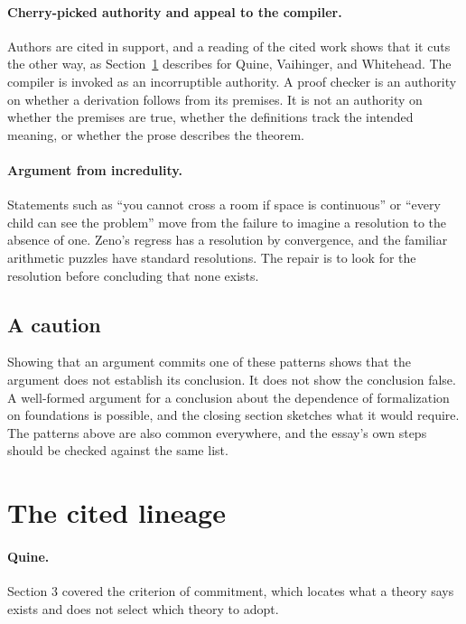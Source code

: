 \documentclass[11pt]{article}
\begin{document}
\paragraph{Cherry-picked authority and appeal to the compiler.} Authors are cited in support, and a reading of the cited work shows that it cuts the other way, as Section~\ref{sec:lineage} describes for Quine, Vaihinger, and Whitehead. The compiler is invoked as an incorruptible authority. A proof checker is an authority on whether a derivation follows from its premises. It is not an authority on whether the premises are true, whether the definitions track the intended meaning, or whether the prose describes the theorem.

\paragraph{Argument from incredulity.} Statements such as ``you cannot cross a room if space is continuous'' or ``every child can see the problem'' move from the failure to imagine a resolution to the absence of one. Zeno's regress has a resolution by convergence, and the familiar arithmetic puzzles have standard resolutions. The repair is to look for the resolution before concluding that none exists.

\subsection{A caution}

Showing that an argument commits one of these patterns shows that the argument does not establish its conclusion. It does not show the conclusion false. A well-formed argument for a conclusion about the dependence of formalization on foundations is possible, and the closing section sketches what it would require. The patterns above are also common everywhere, and the essay's own steps should be checked against the same list.

\section{The cited lineage}
\label{sec:lineage}

\paragraph{Quine.} Section 3 covered the criterion of commitment, which locates what a theory says exists and does not select which theory to adopt.
\end{document}
